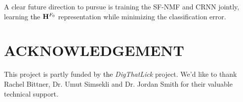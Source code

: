 \documentclass{article}
\newcommand{\jb}[1]{{\textcolor{black}{#1}}}
\newcommand{\jbcor}[2]{{\textcolor{black}{#2}}}
\begin{document}
A clear future direction to pursue is training the SF-NMF and CRNN \jbcor{network}{} jointly, learning \jb{the} $\mathbf{H}^{F_{0}}$ representation while minimizing the classification error. 

\section{ACKNOWLEDGEMENT}
This project is partly funded by \jb{the} \emph{DigThatLick} project. We'd like to thank Rachel Bittner, Dr. Umut Simsekli and Dr. Jordan Smith for their valuable technical support. 


%
%
%
%

 
\end{document}
